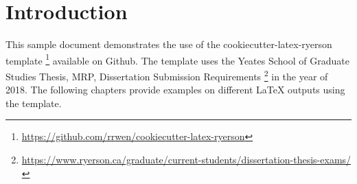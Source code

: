 

\chapter*{Introduction} \label{introduction}

This sample document demonstrates the use of the cookiecutter-latex-ryerson template \footnote{\url{https://github.com/rrwen/cookiecutter-latex-ryerson}} available on Github. The template uses the Yeates School of Graduate Studies Thesis, MRP, Dissertation Submission Requirements \footnote{\url{https://www.ryerson.ca/graduate/current-students/dissertation-thesis-exams/}} in the year of 2018. The following chapters provide examples on different LaTeX outputs using the template.
